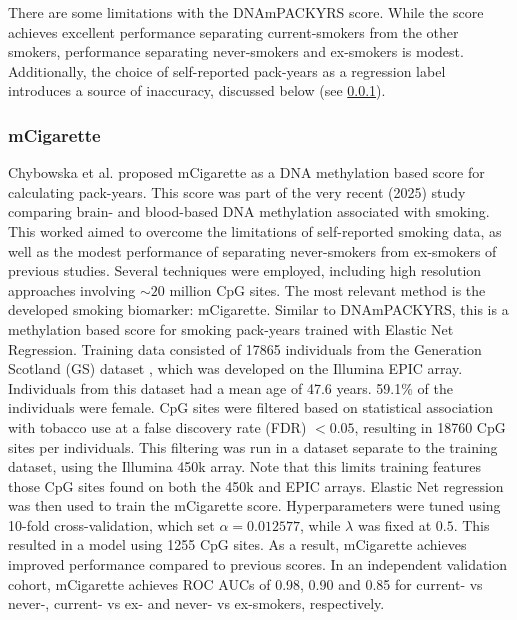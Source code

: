 \documentclass[draft]{article}
\begin{document}
There are some limitations with the DNAmPACKYRS score. While the score achieves excellent performance separating current-smokers from the other smokers, performance separating never-smokers and ex-smokers is modest. Additionally, the choice of self-reported pack-years as a regression label introduces a source of inaccuracy, discussed below (see \ref{sec:mcigarette}).


\subsubsection{mCigarette} \label{sec:mcigarette}
Chybowska et al. \cite{chybowska2025blood} proposed mCigarette as a DNA methylation based score for calculating pack-years. This score was part of the very recent (2025) study comparing brain- and blood-based DNA methylation associated with smoking. This worked aimed to overcome the limitations of self-reported smoking data, as well as the modest performance of separating never-smokers from ex-smokers of previous studies. Several techniques were employed, including high resolution approaches involving \(\sim \! 20\) million CpG sites. The most relevant method is the developed smoking biomarker: mCigarette. Similar to DNAmPACKYRS, this is a methylation based score for smoking pack-years trained with Elastic Net Regression. Training data consisted of \num{17865} individuals from the Generation Scotland (GS) dataset \cite{smith2006generation}, which was developed on the Illumina EPIC array. Individuals from this dataset had a mean age of 47.6 years. 59.1\% of the individuals were female. CpG sites were filtered based on statistical association with tobacco use at a false discovery rate (FDR) \(< 0.05\), resulting in \num{18760} CpG sites per individuals. This filtering was run in a dataset separate to the training dataset, using the Illumina 450k array. Note that this limits training features those CpG sites found on both the 450k and EPIC arrays. Elastic Net regression was then used to train the mCigarette score. Hyperparameters were tuned using 10-fold cross-validation, which set \(\alpha = 0.012577\), while \(\lambda\) was fixed at \(0.5\). This resulted in a model using \num{1255} CpG sites. As a result, mCigarette achieves improved performance compared to previous scores. In an independent validation cohort, mCigarette achieves ROC AUCs of 0.98, 0.90 and 0.85 for current- vs never-, current- vs ex- and never- vs ex-smokers, respectively.
\end{document}

